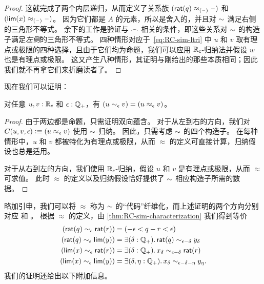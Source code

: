 \begin{proof}
  这就完成了两个内层递归，从而定义了关系族 $(\mathsf{rat}(q)\approx_{(\mathord{\hspace{1pt}\text{--}\hspace{1pt}})}\mathord{\hspace{1pt}\text{--}\hspace{1pt}})$ 和 $(\mathsf{lim}(x)\approx_{(\mathord{\hspace{1pt}\text{--}\hspace{1pt}})}\mathord{\hspace{1pt}\text{--}\hspace{1pt}})$。
  因为它们都是 $A$ 的元素，所以是舍入的，并且对 $\mathord\sim$ 满足右侧的三角形不等式。
  余下的工作是验证与 $\frown$ 相关的条件，即这些关系对 $\mathord\sim$ 的构造子满足\emph{左侧}的三角形不等式。
  四种情形对应于~\eqref{eq:RC-sim-ltri} 中 $u$ 和 $v$ 取有理点或极限的四种选择，且由于它们均为命题，我们可以应用 $\mathbb{R}_\mathsf{c}$-归纳法并假设 $w$ 也是有理点或极限。
  这又产生八种情形，其证明与刚给出的那些本质相同；因此我们就不再拿它们来折磨读者了。
\end{proof}

现在我们可以证明：

\begin{thm}\label{thm:RC-sim-characterization}
  对任意 $u,v:\mathbb{R}_\mathsf{c}$ 和 $\epsilon:\mathbb{Q}_{+}$，有 $(u\sim_{\epsilon} v) = (u\approx_\epsilon v)$。
\end{thm}

\begin{proof}
  由于两边都是命题，只需证明双向蕴含。
  对于从左到右的方向，我们对 $C(u,v,\epsilon)\vcentcolon\equiv (u\approx_\epsilon v)$ 使用 $\mathord\sim$-归纳。
  因此，只需考虑 $\mathord\sim$ 的四个构造子。
  在每种情形中，$u$ 和 $v$ 都被特化为有理点或极限，从而 $\approx$ 的定义可直接计算，归纳假设也总是适用。

  对于从右到左的方向，我们使用 $\mathbb{R}_\mathsf{c}$-归纳，假设 $u$ 和 $v$ 是有理点或极限，从而 $\approx$ 可求值。
  此时 $\approx$ 的定义以及归纳假设恰好提供了 $\mathord\sim$ 相应构造子所需的数据。
\end{proof}

%
略加引申，我们可以将 $\approx$ 称为 $\mathord\sim$ 的``代码''纤维化，而上述证明的两个方向分别对应 \encode 和 \decode。
根据 $\approx$ 的定义，由 \cref{thm:RC-sim-characterization} 我们得到等价
\begin{align*}
  (\rcrat(q) \close\epsilon \rcrat(r))  &=
  (-\epsilon < q - r < \epsilon)\\
  (\rcrat(q) \close\epsilon \rclim(y)) &=
  \exis{\delta : \Qp} \rcrat(q) \close{\epsilon - \delta} y_\delta\\
  (\rclim(x) \close\epsilon \rcrat(r)) &=
  \exis{\delta : \Qp} x_\delta \close{\epsilon - \delta} \rcrat(r)\\
  (\rclim(x) \close\epsilon \rclim(y)) &=
  \exis{\delta, \eta : \Qp} x_\delta \close{\epsilon - \delta - \eta} y_\eta.
\end{align*}
我们的证明还给出以下附加信息。

